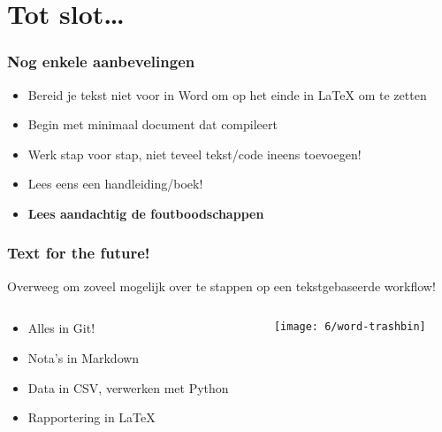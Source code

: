 \documentclass[aspectratio=169]{beamer}
\begin{document}
\section{Tot slot\ldots}

\begin{frame}
  \frametitle{Nog enkele aanbevelingen}

  \begin{itemize}
    \item Bereid je tekst niet voor in Word om op het einde in {\LaTeX} om te zetten
    \item Begin met minimaal document dat compileert
    \item Werk stap voor stap, niet teveel tekst/code ineens toevoegen!
    \item Lees eens een handleiding/boek!
    \item \textbf{Lees aandachtig de foutboodschappen}
  \end{itemize}

\end{frame}

\begin{frame}
  \frametitle{Text for the future!}

  Overweeg om zoveel mogelijk over te stappen op een tekstgebaseerde workflow!

  \begin{columns}
    \begin{column}{.7\textwidth}
      \begin{itemize}
        \item Alles in Git!
        \item Nota's in Markdown
        \item Data in CSV, verwerken met Python
        \item Rapportering in LaTeX
      \end{itemize}
    \end{column}

    \begin{column}{.3\textwidth}
      \texttt{[image: 6/word-trashbin]}
    \end{column}
  \end{columns}

  
\end{frame}
\end{document}
